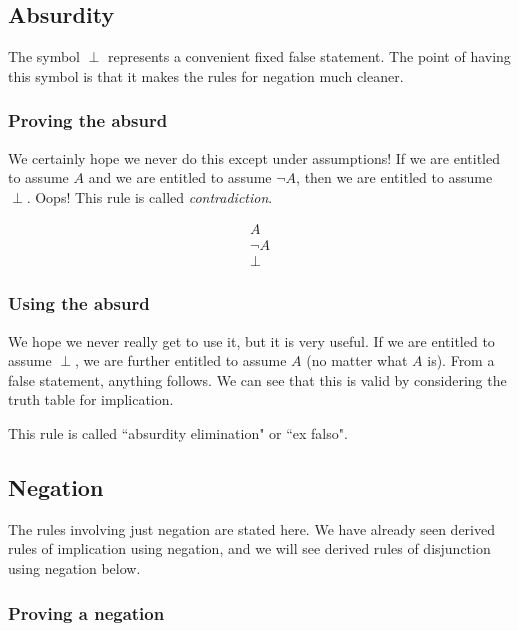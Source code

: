 \documentclass[12pt]{article}
\begin{document}
\subsection{Absurdity}

The symbol $\perp$ represents a convenient fixed false statement.   The point of having this symbol is that it makes the rules for negation much cleaner.

\subsubsection{Proving the absurd}

We certainly hope we never do this except under assumptions!  If we are entitled to assume $A$ and we are entitled to assume $\neg A$, then we are entitled to assume $\perp$.  Oops!  This rule is called {\em contradiction\/}.

$$\begin{array}{r} A \\ \neg A \\ \hline \perp \end{array}$$

\subsubsection{Using the absurd}

We hope we never really get to use it, but it is very useful.  If we are entitled to assume $\perp$, we are further entitled to assume $A$ (no matter what $A$ is).  From a false statement, anything follows.  We can see that this is valid by considering the truth table for implication.

This rule is called ``absurdity elimination" or ``ex falso".

\subsection{Negation}

The rules involving just negation are stated here.  We have already seen derived rules of implication using negation, and we will see derived rules of disjunction using negation below.

\subsubsection{Proving a negation}
\end{document}
